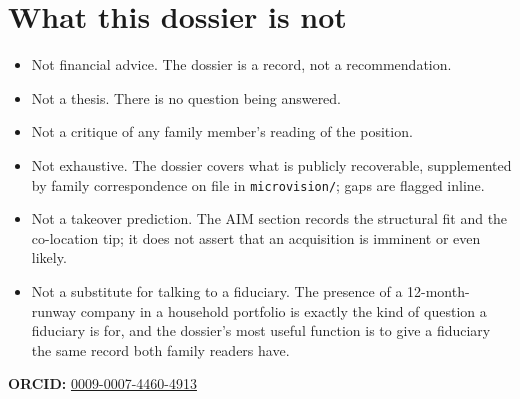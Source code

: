 \documentclass[10pt,letterpaper,twocolumn]{article}
\begin{document}
\section{What this dossier is not}

\begin{itemize}
  \item Not financial advice. The dossier is a record, not a recommendation.
  \item Not a thesis. There is no question being answered.
  \item Not a critique of any family member's reading of the position.
  \item Not exhaustive. The dossier covers what is publicly recoverable, supplemented by family correspondence on file in \texttt{microvision/}; gaps are flagged inline.
  \item Not a takeover prediction. The AIM section records the structural fit and the co-location tip; it does not assert that an acquisition is imminent or even likely.
  \item Not a substitute for talking to a fiduciary. The presence of a 12-month-runway company in a household portfolio is exactly the kind of question a fiduciary is for, and the dossier's most useful function is to give a fiduciary the same record both family readers have.
\end{itemize}

\vspace{0.5em}
\noindent\textbf{ORCID:} \href{https://orcid.org/0009-0007-4460-4913}{0009-0007-4460-4913}

\sloppy
\renewcommand{\bibfont}{\footnotesize}
\setlength{\bibsep}{0.35em}


\end{document}
